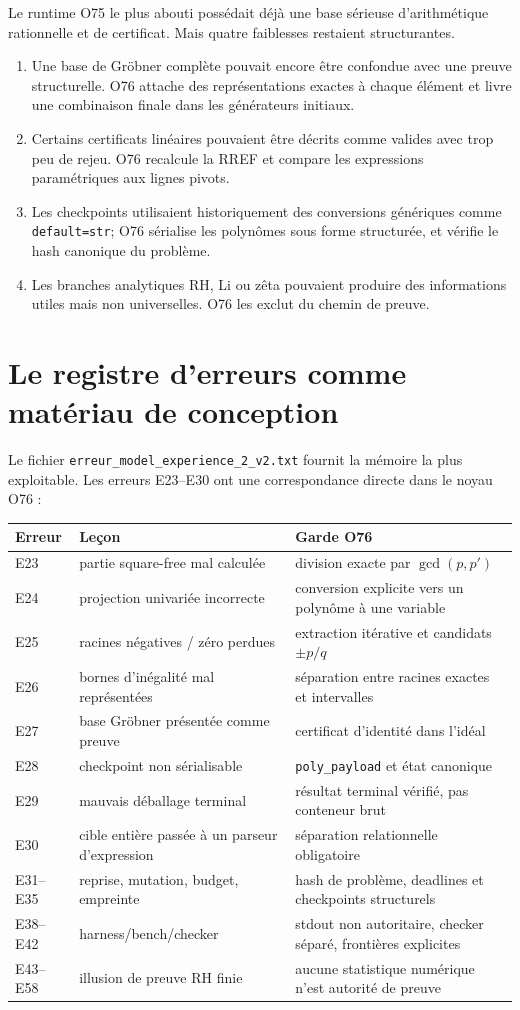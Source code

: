 \documentclass[11pt,a4paper]{article}
\begin{document}
Le runtime O75 le plus abouti possédait déjà une base sérieuse d'arithmétique rationnelle et de certificat. Mais quatre faiblesses restaient structurantes.
\begin{enumerate}
\item Une base de Gröbner complète pouvait encore être confondue avec une preuve structurelle. O76 attache des représentations exactes à chaque élément et livre une combinaison finale dans les générateurs initiaux.
\item Certains certificats linéaires pouvaient être décrits comme valides avec trop peu de rejeu. O76 recalcule la RREF et compare les expressions paramétriques aux lignes pivots.
\item Les checkpoints utilisaient historiquement des conversions génériques comme \texttt{default=str}; O76 sérialise les polynômes sous forme structurée, et vérifie le hash canonique du problème.
\item Les branches analytiques RH, Li ou zêta pouvaient produire des informations utiles mais non universelles. O76 les exclut du chemin de preuve.
\end{enumerate}

\section{Le registre d'erreurs comme matériau de conception}
Le fichier \texttt{erreur\_model\_experience\_2\_v2.txt} fournit la mémoire la plus exploitable. Les erreurs E23--E30 ont une correspondance directe dans le noyau O76 :
\begin{longtable}{p{}p{}p{}}
\toprule
Erreur & Leçon & Garde O76\\
\midrule
E23 & partie square-free mal calculée & division exacte par $\gcd(p,p')$\\
E24 & projection univariée incorrecte & conversion explicite vers un polynôme à une variable\\
E25 & racines négatives / zéro perdues & extraction itérative et candidats $\pm p/q$\\
E26 & bornes d'inégalité mal représentées & séparation entre racines exactes et intervalles\\
E27 & base Gröbner présentée comme preuve & certificat d'identité dans l'idéal\\
E28 & checkpoint non sérialisable & \texttt{poly\_payload} et état canonique\\
E29 & mauvais déballage terminal & résultat terminal vérifié, pas conteneur brut\\
E30 & cible entière passée à un parseur d'expression & séparation relationnelle obligatoire\\
E31--E35 & reprise, mutation, budget, empreinte & hash de problème, deadlines et checkpoints structurels\\
E38--E42 & harness/bench/checker & stdout non autoritaire, checker séparé, frontières explicites\\
E43--E58 & illusion de preuve RH finie & aucune statistique numérique n'est autorité de preuve\\
\bottomrule
\end{longtable}
\end{document}
